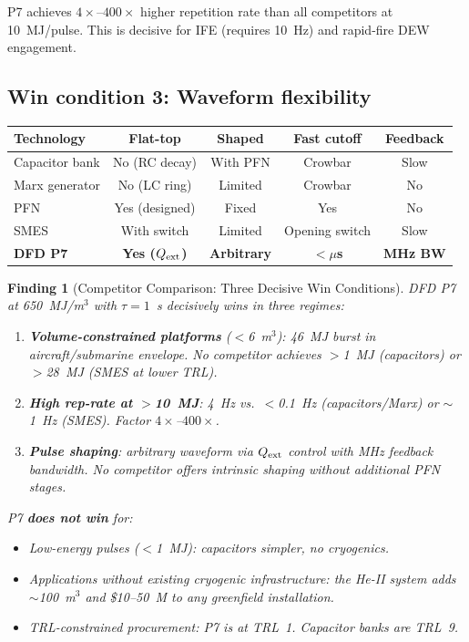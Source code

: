 \documentclass[11pt]{article}
\newtheorem{finding}{Finding}
\begin{document}
P7 achieves $4\times$--$400\times$ higher repetition rate than all
competitors at 10~MJ/pulse. This is decisive for IFE (requires 10~Hz)
and rapid-fire DEW engagement.

\subsection{Win condition 3: Waveform flexibility}

\begin{center}
\begin{tabular}{lcccc}
\toprule
Technology & Flat-top & Shaped & Fast cutoff & Feedback \\
\midrule
Capacitor bank & No (RC decay) & With PFN & Crowbar & Slow \\
Marx generator & No (LC ring) & Limited & Crowbar & No \\
PFN & Yes (designed) & Fixed & Yes & No \\
SMES & With switch & Limited & Opening switch & Slow \\
\textbf{DFD P7} & \textbf{Yes ($Q_{\rm ext}$)} & \textbf{Arbitrary}
  & \textbf{$<$$\mu$s} & \textbf{MHz BW} \\
\bottomrule
\end{tabular}
\end{center}

\begin{finding}[Competitor Comparison: Three Decisive Win Conditions]
\label{find:win-conditions}
DFD P7 at 650~MJ/m$^3$ with $\tau = 1$~s decisively wins in three
regimes:
\begin{enumerate}[nosep]
  \item \textbf{Volume-constrained platforms} ($<$6~m$^3$): 46~MJ burst
    in aircraft/submarine envelope. No competitor achieves $>$1~MJ
    (capacitors) or $>$28~MJ (SMES at lower TRL).
  \item \textbf{High rep-rate at $>$10~MJ}: 4~Hz vs.\ $<$0.1~Hz
    (capacitors/Marx) or $\sim$1~Hz (SMES). Factor $4\times$--$400\times$.
  \item \textbf{Pulse shaping}: arbitrary waveform via $Q_{\rm ext}$
    control with MHz feedback bandwidth. No competitor offers intrinsic
    shaping without additional PFN stages.
\end{enumerate}

P7 \textbf{does not win} for:
\begin{itemize}[nosep]
  \item Low-energy pulses ($<$1~MJ): capacitors simpler, no cryogenics.
  \item Applications without existing cryogenic infrastructure: the
    He-II system adds $\sim$100~m$^3$ and \$10--50~M to any greenfield
    installation.
  \item TRL-constrained procurement: P7 is at TRL~1. Capacitor banks
    are TRL~9.
\end{itemize}
\end{finding}
\end{document}
